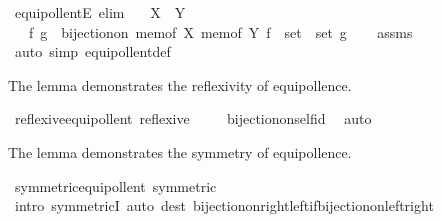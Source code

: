 \begin{isabellebody}
\endisatagproof
{\isafoldproof}%
%
\isadelimproof
\isanewline
%
\endisadelimproof
\isanewline
{}\isamarkupfalse%
\ equipollentE\ {\isacharbrackleft}{\kern0pt}elim{\isacharbrackright}{\kern0pt}{\isacharcolon}{\kern0pt}\isanewline
\ \ \ {\isachardoublequoteopen}X\ {\isasymapprox}\ Y{\isachardoublequoteclose}\isanewline
\ \ \ f\ g\ \ {\isachardoublequoteopen}bijection{\isacharunderscore}{\kern0pt}on\ {\isacharparenleft}{\kern0pt}mem{\isacharunderscore}{\kern0pt}of\ X{\isacharparenright}{\kern0pt}\ {\isacharparenleft}{\kern0pt}mem{\isacharunderscore}{\kern0pt}of\ Y{\isacharparenright}{\kern0pt}\ {\isacharparenleft}{\kern0pt}f\ {\isacharcolon}{\kern0pt}{\isacharcolon}{\kern0pt}\ set\ {\isasymRightarrow}\ set{\isacharparenright}{\kern0pt}\ g{\isachardoublequoteclose}\isanewline
%
\isadelimproof
\ \ %
\endisadelimproof
%
\isatagproof
{}\isamarkupfalse%
\ assms\ \isamarkupfalse%
\ {\isacharparenleft}{\kern0pt}auto\ simp{\isacharcolon}{\kern0pt}\ equipollent{\isacharunderscore}{\kern0pt}def{\isacharparenright}{\kern0pt}%
\endisatagproof
{\isafoldproof}%
%
\isadelimproof
%
\endisadelimproof
%
\begin{isamarkuptext}%
The lemma demonstrates the reflexivity of equipollence.%
\end{isamarkuptext}\isamarkuptrue%
\isamarkupfalse%
\ reflexive{\isacharunderscore}{\kern0pt}equipollent{\isacharcolon}{\kern0pt}\ {\isachardoublequoteopen}reflexive\ {\isacharparenleft}{\kern0pt}{\isasymapprox}{\isacharparenright}{\kern0pt}{\isachardoublequoteclose}\isanewline
%
\isadelimproof
\ \ %
\endisadelimproof
%
\isatagproof
{}\isamarkupfalse%
\ bijection{\isacharunderscore}{\kern0pt}on{\isacharunderscore}{\kern0pt}self{\isacharunderscore}{\kern0pt}id\ \isamarkupfalse%
\ auto%
\endisatagproof
{\isafoldproof}%
%
\isadelimproof
%
\endisadelimproof
%
\begin{isamarkuptext}%
The lemma demonstrates the symmetry of equipollence.%
\end{isamarkuptext}\isamarkuptrue%
\isamarkupfalse%
\ symmetric{\isacharunderscore}{\kern0pt}equipollent{\isacharcolon}{\kern0pt}\ {\isachardoublequoteopen}symmetric\ {\isacharparenleft}{\kern0pt}{\isasymapprox}{\isacharparenright}{\kern0pt}{\isachardoublequoteclose}\isanewline
%
\isadelimproof
\ \ %
\endisadelimproof
%
\isatagproof
{}\isamarkupfalse%
\ {\isacharparenleft}{\kern0pt}intro\ symmetricI{\isacharparenright}{\kern0pt}\ {\isacharparenleft}{\kern0pt}auto\ dest{\isacharcolon}{\kern0pt}\ bijection{\isacharunderscore}{\kern0pt}on{\isacharunderscore}{\kern0pt}right{\isacharunderscore}{\kern0pt}left{\isacharunderscore}{\kern0pt}if{\isacharunderscore}{\kern0pt}bijection{\isacharunderscore}{\kern0pt}on{\isacharunderscore}{\kern0pt}left{\isacharunderscore}{\kern0pt}right{\isacharparenright}{\kern0pt}%

\end{isabellebody}
